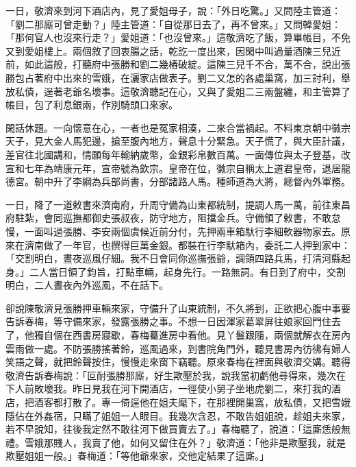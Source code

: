 一日，敬濟來到河下酒店內，見了愛姐母子，說：「外日吃驚。」又問陸主管道：「劉二那廝可曾走動？」陸主管道：「自從那日去了，再不曾來。」又問韓愛姐：「那何官人也沒來行走？」愛姐道：「也沒曾來。」這敬濟吃了飯，算畢帳目，不免又到愛姐樓上。兩個敘了回衷腸之話，乾訖一度出來，因閑中叫過量酒陳三兒近前，如此這般，打聽府中張勝和劉二幾樁破綻。這陳三兒千不合，萬不合，說出張勝包占著府中出來的雪娥，在灑家店做表子。劉二又怎的各處巢窩，加三討利，舉放私債，逞著老爺名壞事。這敬濟聽記在心，又與了愛姐二三兩盤纏，和主管算了帳目，包了利息銀兩，作別騎頭口來家。

閑話休題。一向懷意在心，一者也是冤家相湊，二來合當禍起。不料東京朝中徽宗天子，見大金人馬犯邊，搶至腹內地方，聲息十分緊急。天子慌了，與大臣計議，差官往北國講和，情願每年輸納歲幣，金銀彩帛數百萬。一面傳位與太子登基，改宣和七年為靖康元年，宣帝號為欽宗。皇帝在位，徽宗自稱太上道君皇帝，退居龍德宮。朝中升了李綱為兵部尚書，分部諸路人馬。種師道為大將，總督內外軍務。

一日，降了一道敕書來濟南府，升周守備為山東都統制，提調人馬一萬，前往東昌府駐紮，會同巡撫都御史張叔夜，防守地方，阻擋金兵。守備領了敕書，不敢怠慢，一面叫過張勝、李安兩個虞候近前分付，先押兩車箱馱行李細軟器物家去。原來在濟南做了一年官，也撰得巨萬金銀。都裝在行李馱箱內，委託二人押到家中：「交割明白，晝夜巡風仔細。我不日會同你巡撫張爺，調領四路兵馬，打清河縣起身。」二人當日領了鈞旨，打點車輛，起身先行。一路無詞。有日到了府中，交割明白，二人晝夜內外巡風，不在話下。

卻說陳敬濟見張勝押車輛來家，守備升了山東統制，不久將到，正欲把心腹中事要告訴春梅，等守備來家，發露張勝之事。不想一日因渾家葛翠屏往娘家回門住去了，他獨自個在西書房寢歇，春梅驀進房中看他。見丫鬟跟隨，兩個就解衣在房內雲雨做一處。不防張勝搖著鈴，巡風過來，到書院角門外，聽見書房內彷彿有婦人笑語之聲，就把鈴聲按住，慢慢走來窗下竊聽。原來春梅在裡面與敬濟交媾。聽得敬濟告訴春梅說：「叵耐張勝那廝，好生欺壓於我，說我當初虧他尋得來，幾次在下人前敗壞我。昨日見我在河下開酒店，一徑使小舅子坐地虎劉二，來打我的酒店，把酒客都打散了。專一倚逞他在姐夫麾下，在那裡開巢窩，放私債，又把雪娥隱佔在外姦宿，只瞞了姐姐一人眼目。我幾次含忍，不敢告姐姐說，趁姐夫來家，若不早說知，往後我定然不敢往河下做買賣去了。」春梅聽了，說道：「這廝恁般無禮。雪娥那賤人，我賣了他，如何又留住在外？」敬濟道：「他非是欺壓我，就是欺壓姐姐一般。」春梅道：「等他爺來家，交他定結果了這廝。」

